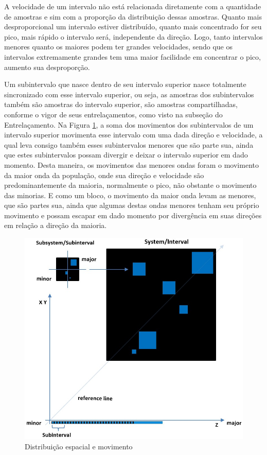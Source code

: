 A velocidade de um intervalo não está relacionada diretamente com a quantidade de amostras e sim com a proporção da distribuição dessas amostras. Quanto mais desproporcional um intervalo estiver distribuído, quanto mais concentrado for seu pico, mais rápido o intervalo será, independente da direção. Logo, tanto intervalos menores quanto os maiores podem ter grandes velocidades, sendo que os intervalos extremamente grandes tem uma maior facilidade em concentrar o pico, aumento sua desproporção.

Um subintervalo que nasce dentro de seu intervalo superior nasce totalmente sincronizado com esse intervalo superior, ou seja, as amostras dos subintervalos também são amostras do intervalo superior, são amostras compartilhadas, conforme o vigor de seus entrelaçamentos, como visto na subseção do Entrelaçamento. Na Figura \ref{fig:consciousness_space_plan}, a soma dos movimentos dos subintervalos de um intervalo superior movimenta esse intervalo com uma dada direção e velocidade, a qual leva consigo também esses subintervalos menores que são parte sua, ainda que estes subintervalos possam divergir e deixar o intervalo superior em dado momento. Desta maneira, os movimentos das menores ondas foram o movimento da maior onda da população, onde sua direção e velocidade são predominantemente da maioria, normalmente o pico, não obstante o movimento das minorias. E como um bloco, o movimento da maior onda levam as menores, que são partes sua, ainda que algumas destas ondas menores tenham seu próprio movimento e possam escapar em dado momento por divergência em suas direções em relação a direção da maioria.
	\begin{figure}[H]
	\caption{Distribuição espacial e movimento}
	\label{fig:consciousness_space_plan}
	\centering
	\includegraphics[scale=.6]{sections/images/consciousness_space_plan.jpg}
	\end{figure}
	

